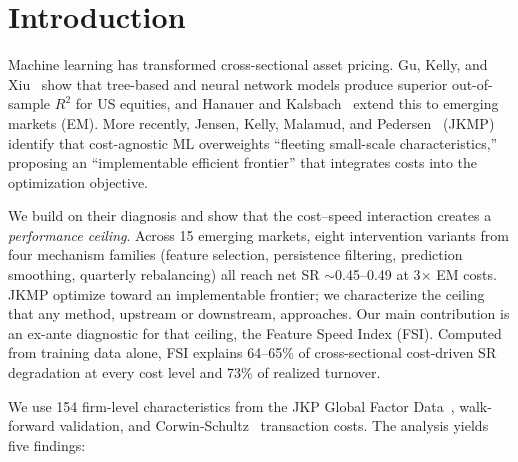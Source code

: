 \documentclass[sigconf,balance=false]{acmart}
\begin{document}


\maketitle


\section{Introduction}

Machine learning has transformed cross-sectional asset pricing. Gu,
Kelly, and Xiu~\cite{gu2020empirical} show that tree-based and neural
network models produce superior out-of-sample $R^2$ for US equities,
and Hanauer and Kalsbach~\cite{hanauer2023machine} extend this to
emerging markets (EM). More recently, Jensen, Kelly, Malamud, and
Pedersen~\cite{jensen2024implementable} (JKMP) identify that
cost-agnostic ML overweights ``fleeting small-scale characteristics,''
proposing an ``implementable efficient frontier'' that integrates costs
into the optimization objective.

We build on their diagnosis and show that the cost--speed interaction
creates a \emph{performance ceiling}. Across 15 emerging markets, eight
intervention variants from four mechanism families (feature
selection, persistence filtering, prediction smoothing, quarterly
rebalancing) all reach net SR ${\sim}$0.45--0.49 at 3$\times$ EM costs.
JKMP optimize toward an implementable frontier; we characterize the
ceiling that any method, upstream or downstream, approaches. Our main
contribution is an ex-ante diagnostic for that ceiling, the Feature
Speed Index (FSI). Computed from training data alone, FSI explains
64--65\% of cross-sectional cost-driven SR degradation at every cost
level and 73\% of realized turnover.

We use 154 firm-level characteristics from the JKP Global Factor
Data~\cite{JensenKellyPedersen2023}, walk-forward validation, and
Corwin-Schultz~\cite{corwinschultz2012} transaction costs. The
analysis yields five findings:
\end{document}
